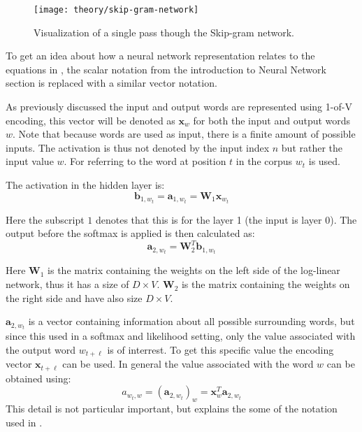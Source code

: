 \begin{figure}[H]
	\centering
	\texttt{[image: theory/skip-gram-network]}
	\caption{Visualization of a single pass though the Skip-gram network.}
\end{figure}

To get an idea about how a neural network representation relates to the equations in \cite{word2vec-details}, the scalar notation from the introduction to Neural Network section is replaced with a similar vector notation.

As previously discussed the input and output words are represented using 1-of-V encoding, this vector will be denoted as $\mathbf{x}_w$ for both the input and output words $w$. Note that because words are used as input, there is a finite amount of possible inputs. The activation is thus not denoted by the input index $n$ but rather the input value $w$. For referring to the word at position $t$ in the corpus $w_t$ is used.

The activation in the hidden layer is:
\begin{equation}
\mathbf{b}_{1,w_t} = \mathbf{a}_{1,w_t} = \mathbf{W}_{1} \mathbf{x}_{w_t}
\end{equation}

Here the subscript $1$ denotes that this is for the layer 1 (the input is layer 0). The output before the softmax is applied is then calculated as:
\begin{equation}
\mathbf{a}_{2,w_t} = \mathbf{W}_2^T \mathbf{b}_{1,w_t}
\end{equation}

Here $\mathbf{W}_1$ is the matrix containing the weights on the left side of the log-linear network, thus it has a size of $D \times V$. $\mathbf{W}_2$ is the matrix containing the weights on the right side and have also size $D \times V$.

$\mathbf{a}_{2,w_t}$ is a vector containing information about all possible surrounding words, but since this used in a softmax and likelihood setting, only the value associated with the output word $w_{t + \ell}$ is of interrest. To get this specific value the encoding vector $\mathbf{x}_{t + \ell}$ can be used. In general the value associated with the word $w$ can be obtained using:
\begin{equation}
a_{w_t,w} = \left(\mathbf{a}_{2,w_t}\right)_w = \mathbf{x}_{w}^T \mathbf{a}_{2,w_t}
\end{equation}
This detail is not particular important, but explains the some of the notation used in \cite{word2vec-details}.

